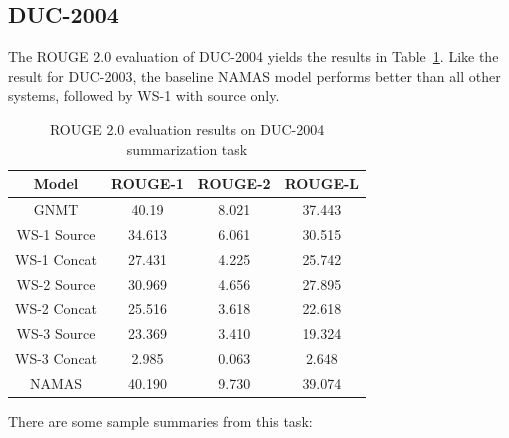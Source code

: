\documentclass[letterpaper]{article} %
\begin{document}
\subsection{DUC-2004}
The ROUGE 2.0 evaluation of DUC-2004 yields the results in Table~\ref{table:rougeduc2004}. Like the result for DUC-2003, the baseline NAMAS model performs better than all other systems, followed by WS-1 with source only.

\begin{table}[h]
	\begin{tabular}{c c c c}
		Model & ROUGE-1 & ROUGE-2 & ROUGE-L \\
		\hline
		GNMT & 40.19 & 8.021 & 37.443 \\
		WS-1 Source & 34.613 & 6.061 & 30.515 \\
		WS-1 Concat & 27.431 & 4.225 & 25.742 \\
		WS-2 Source & 30.969 & 4.656 & 27.895 \\
		WS-2 Concat & 25.516 & 3.618 & 22.618 \\
		WS-3 Source & 23.369 & 3.410 & 19.324 \\
		WS-3 Concat & 2.985 & 0.063 & 2.648 \\
		\hline
		NAMAS & 40.190 & 9.730& 39.074
	\end{tabular}
	\caption{ROUGE 2.0 evaluation results on DUC-2004 summarization task}
	\label{table:rougeduc2004}
\end{table}

There are some sample summaries from this task:
\end{document}
